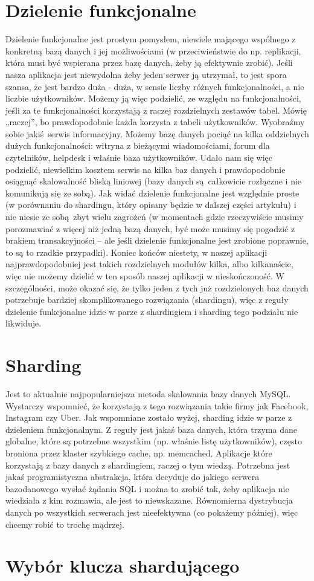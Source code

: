 \documentclass[a4paper,12pt]{article}
\begin{document}
\section{Dzielenie funkcjonalne}
Dzielenie funkcjonalne jest prostym pomysłem, niewiele mającego wspólnego z konkretną bazą danych i jej możliwościami (w przeciwieństwie do np. replikacji, która musi być wspierana przez bazę danych, żeby ją efektywnie zrobić). Jeśli nasza aplikacja jest niewydolna żeby jeden serwer ją utrzymał, to jest spora szansa, że jest bardzo duża - duża, w sensie liczby różnych funkcjonalności, a nie liczbie użytkowników. Możemy ją więc podzielić, ze względu na funkcjonalności, jeśli za te funkcjonalności korzystają z raczej rozdzielnych zestawów tabel. Mówię „raczej”, bo prawdopodobnie każda korzysta z tabeli użytkowników. Wyobraźmy sobie jakiś serwis informacyjny. Możemy bazę danych pociąć na kilka oddzielnych dużych funkcjonalności: witryna z bieżącymi wiadomościami, forum dla czytelników, helpdesk i właśnie baza użytkowników. Udało nam się więc podzielić, niewielkim kosztem serwis na kilka baz danych i prawdopodobnie osiągnąć  skalowalność bliską liniowej (bazy danych są całkowicie rozłączne i nie komunikują się ze sobą). Jak widać dzielenie funkcjonalne jest względnie proste (w porównaniu do shardingu, który opisany będzie w dalszej części artykułu) i nie niesie ze sobą zbyt wielu zagrożeń (w momentach gdzie rzeczywiście musimy porozmawiać z więcej niż jedną bazą danych, być może musimy się pogodzić z brakiem transakcyjności – ale jeśli dzielenie funkcjonalne jest zrobione poprawnie, to są to rzadkie przypadki). Koniec końców niestety, w naszej aplikacji najprawdopodobniej jest takich rozdzielnych modułów kilka, albo kilkanaście, więc nie możemy dzielić w ten sposób naszej aplikacji w nieskończoność. W szczególności, może okazać się, że tylko jeden z tych już rozdzielonych baz danych potrzebuje bardziej skomplikowanego rozwiązania (shardingu), więc z reguły dzielenie funkcjonalne idzie w parze z shardingiem i sharding tego podziału nie likwiduje.

\section{Sharding}
Jest to aktualnie najpopularniejsza metoda skalowania bazy danych MySQL. Wystarczy wspomnieć, że korzystają z tego rozwiązania takie firmy jak Facebook, Instagram czy Uber. Jak wspomniane zostało wyżej, sharding idzie w parze z dzieleniem funkcjonalnym. Z reguły jest jakaś baza danych, która trzyma dane globalne, które są potrzebne wszystkim (np. właśnie listę użytkowników), często broniona przez klaster szybkiego cache, np. memcached. Aplikacje które korzystają z bazy danych z shardingiem, raczej o tym wiedzą. Potrzebna jest jakaś programistyczna abstrakcja, która decyduje do jakiego serwera bazodanowego wysłać żądania SQL i można to zrobić tak, żeby aplikacja nie wiedziała z kim rozmawia, ale jest to niewskazane. Równomierna dystrybucja danych po wszystkich serwerach jest nieefektywna (co pokażemy później), więc chcemy robić to trochę mądrzej.

\section{Wybór klucza shardującego}
\end{document}
